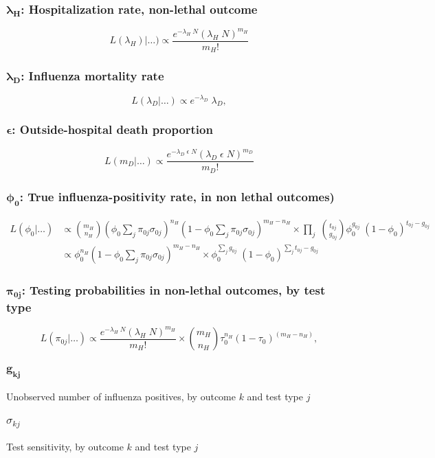 \documentclass{article}[12pt]
\begin{document}
\subsubsection*{$\bm{\lambda_H}$: Hospitalization rate, non-lethal outcome}
%
\begin{equation}
\label{eq:lam_H}
L(\lambda_H)|\ldots) \propto \frac{e^{-\lambda_H \; N} (\lambda_H \; N)^{m_H}}{m_H!}
\end{equation}
%
\subsubsection*{$\bm{\lambda_D}$: Influenza mortality rate}
%
\begin{equation}
\label{eq:lam_D}
L(\lambda_D|\ldots) \propto e^{-\lambda_D}\;\lambda_D ,
\end{equation}
%
\subsubsection*{$\bm{\epsilon}$: Outside-hospital death proportion}
%
\begin{equation}
\label{eq:p_osh}
L(m_D|\ldots) \propto \frac{e^{-\lambda_D\;\epsilon  \; N} (\lambda_D\;\epsilon  \; N)^{m_D}}{m_D!}
\end{equation}
%
\subsubsection*{$\bm{\phi_0}$: True influenza-positivity rate, in non lethal outcomes)}
%
\begin{align}
\nonumber
L(\phi_0|\ldots) &\propto \binom{m_H}{n_H} \left(\phi_0 \sum_{j} \pi_{0j} \sigma_{0j}\right)^{n_H} (1 - \phi_0 \sum_{j} \pi_{0j} \sigma_{0j})^{m_H - n_H} \times
\prod_j\;\binom{t_{0j}}{g_{0j}} \phi_0^{g_{0j}} \;(1 - \phi_0)^{t_{0j} - g_{0j}} \\
\label{eq:phi_0}
 &\propto \phi_0^{n_H} \left(1 - \phi_0 \sum_{j} \pi_{0j} \sigma_{0j}\right)^{m_H - n_H} \times
 \phi_0^{\sum_j g_{0j}} \;(1 - \phi_0)^{\sum_j t_{0j} - g_{0j}} 
\end{align}
%

\subsubsection*{$\bm{\pi_{0j}}$: Testing probabilities in non-lethal outcomes, by test type}
%
\begin{equation}
\label{eq:pi_kj}
L(\pi_{0j}|\ldots) \propto \frac{e^{-\lambda_H \; N} (\lambda_H \; N)^{m_H}}{m_H!}\times \binom{m_H}{n_H} \tau_0^{n_H} (1 - \tau_0)^{(m_H - n_H)},
\end{equation}
%
	
\subsubsection*{$\bm{g_{kj}}$} Unobserved number of influenza positives, by outcome $k$ and test type $j$
\subsubsection*{$\sigma_{kj}$} Test sensitivity, by outcome $k$ and test type $j$
%

\end{document}
